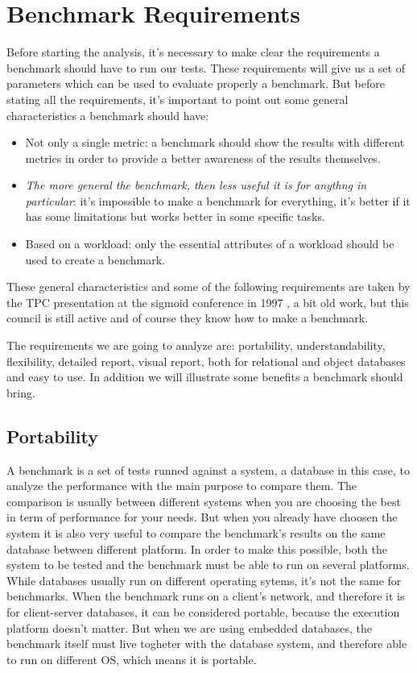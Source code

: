 	\section{Benchmark Requirements}
Before starting the analysis, it's necessary to make clear the requirements a benchmark should have to run our tests. These requirements will give us a set of parameters which can be used to evaluate properly a benchmark. But before stating all the requirements, it's important to point out some general characteristics a benchmark should have:
\begin{itemize}
	\item Not only a single metric: a benchmark should show the results with different metrics in order to provide a better awareness of the results themselves.
	\item \emph{The more general the benchmark, then less useful it is for anythng in particular}: it's impossible to make a benchmark for everything, it's better if it has some limitations but works better in some specific tasks.
	\item Based on a workload: only the essential attributes of a workload should be used to create a benchmark.
\end{itemize}
  
These general characteristics and some of the following requirements are taken by the TPC presentation at the sigmoid conference in 1997 \cite{tpc/sigmoid}, a bit old work, but this council is still active and of course they know how to make a benchmark.

The requirements we are going to analyze are: portability, understandability, flexibility, detailed report, visual report, both for relational and object databases and easy to use. In addition we will illustrate some benefits a benchmark should bring. 

		\subsection{Portability}
A benchmark is a set of tests runned against a system, a database in this case, to analyze the performance with the main purpose to compare them. The comparison is usually between different systems when you are choosing the best in term of performance for your needs. But when you already have choosen the system it is also very useful to compare the benchmark's results on the same database between different platform. In order to make this possible, both the system to be tested and the benchmark must be able to run on several platforms. While databases usually run on different operating sytems, it's not the same for benchmarks. When the benchmark runs on a client's network, and therefore it is for client-server databases, it can be considered portable, because the execution platform doesn't matter. But when we are using embedded databases, the benchmark itself must live togheter with the database system, and therefore able to run on different OS, which means it is portable.

